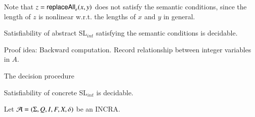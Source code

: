 \documentclass[sigplan,review,anonymous]{acmart}\settopmatter{printfolios=true,printccs=false,printacmref=false}
\begin{document}
Note that $z = \mathsf{replaceAll}_e(x,y)$ does not satisfy the semantic conditions, since the length of $z$ is nonlinear w.r.t. the lengths of $x$ and $y$ in general.

\begin{theorem}
	Satisfiability of abstract SL$_{int}$ satisfying the semantic conditions is decidable.
\end{theorem}

Proof idea: Backward computation. Record relationship between integer variables in $A$.

The decision procedure 

\begin{corollary}
	Satisfiability of concrete SL$_{int}$ is decidable.
\end{corollary}

Let $\mathcal{A}=(\Sigma, Q, I, F, X, \delta)$ be an INCRA. 
\end{document}
